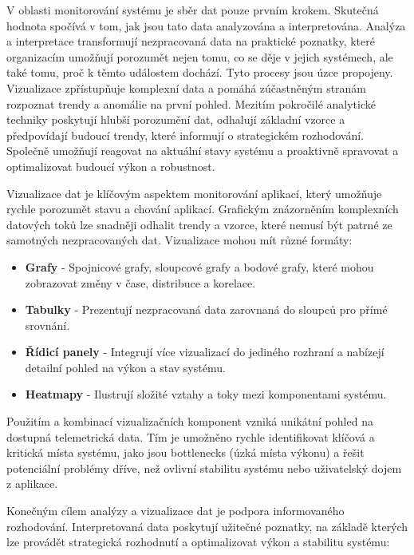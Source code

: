 
V oblasti monitorování systému je sběr dat pouze prvním krokem. Skutečná hodnota spočívá v tom, jak jsou tato data analyzována a interpretována. Analýza a interpretace transformují nezpracovaná data na praktické poznatky, které organizacím umožňují porozumět nejen tomu, co se děje v jejich systémech, ale také tomu, proč k těmto událostem dochází. Tyto procesy jsou úzce propojeny. Vizualizace zpřístupňuje komplexní data a pomáhá zúčastněným stranám rozpoznat trendy a anomálie na první pohled. Mezitím pokročilé analytické techniky poskytují hlubší porozumění dat, odhalují základní vzorce a předpovídají budoucí trendy, které informují o strategickém rozhodování. Společně umožňují reagovat na aktuální stavy systému a proaktivně spravovat a optimalizovat budoucí výkon a robustnost. \cite{Majors2022}


Vizualizace dat je klíčovým aspektem monitorování aplikací, který umožňuje rychle porozumět stavu a chování aplikací. Grafickým znázorněním komplexních datových toků lze snadněji odhalit trendy a vzorce, které nemusí být patrné ze samotných nezpracovaných dat. Vizualizace mohou mít různé formáty:

\begin{itemize}
    \item \textbf{Grafy} - Spojnicové grafy, sloupcové grafy a bodové grafy, které mohou zobrazovat změny v čase, distribuce a korelace.
    \item \textbf{Tabulky} - Prezentují nezpracovaná data zarovnaná do sloupců pro přímé srovnání.
    \item \textbf{Řídicí panely} - Integrují více vizualizací do jediného rozhraní a nabízejí detailní pohled na výkon a stav systému.
    \item \textbf{Heatmapy} - Ilustrují složité vztahy a toky mezi komponentami systému.
\end{itemize}

Použitím a kombinací vizualizačních komponent vzniká unikátní pohled na dostupná telemetrická data. Tím je umožněno rychle identifikovat klíčová a kritická místa systému, jako jsou bottlenecks (úzká místa výkonu) a řešit potenciální problémy dříve, než ovlivní stabilitu systému nebo uživatelský dojem z aplikace. \cite{Chapman2023}


Konečným cílem analýzy a vizualizace dat je podpora informovaného rozhodování. Interpretovaná data poskytují užitečné poznatky, na základě kterých lze provádět strategická rozhodnutí a optimalizovat výkon a stabilitu systému:


